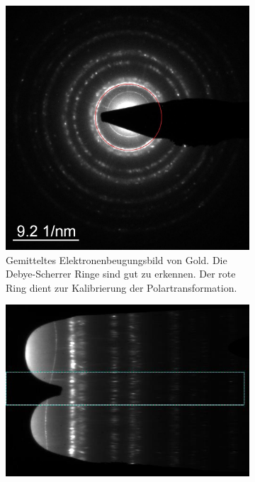 \documentclass[slug=TEM, room=IFW, supervisor=?, coursedate=23.\ 01.\ 2020]{../../Lab_Report_LaTeX/lab_report}
\begin{document}
\begin{figure}[hp]
  \centering
  \begin{subfigure}{.4\textwidth}
    \centering
    \includegraphics[width=\textwidth]{../messungen/gold_diffr/Gold_diffr_m.jpg}%
    \caption{Gemitteltes Elektronenbeugungsbild von Gold. Die
      Debye-Scherrer Ringe sind gut zu erkennen. Der rote Ring dient
      zur Kalibrierung der Polartransformation.}%
    \label{fig:ebeug_orig}
  \end{subfigure}
  \begin{subfigure}{.4\textwidth}
    \centering
    \includegraphics[width=\textwidth]{../messungen/gold_diffr/mean of Gold_diffr_Pol.jpg}%

\end{subfigure}
\end{figure}
\end{document}
